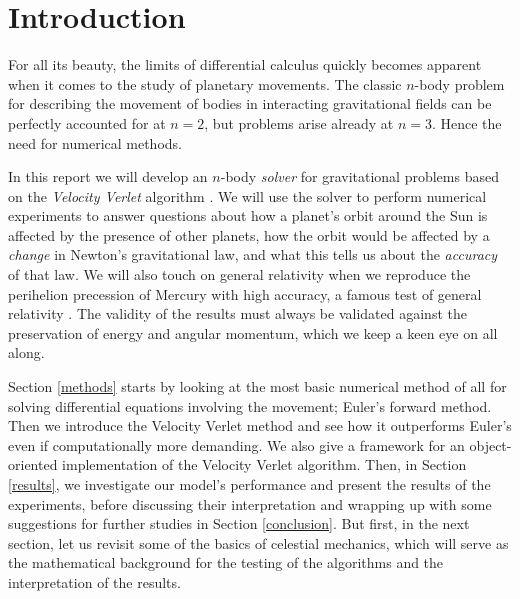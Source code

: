\documentclass[]{article}
\begin{document}
\section{Introduction} \label{intro}
For all its beauty, the limits of differential calculus quickly becomes apparent when it comes to the study of planetary movements. The classic $n$-body problem for describing the movement of bodies in interacting gravitational fields can be perfectly accounted for at $n=2$, but problems arise already at $n=3$. Hence the need for numerical methods.

In this report we will develop an $n$-body \textit{solver} for gravitational problems based on the \textit{Velocity Verlet} algorithm \cite{fys4150-notes}. We will use the solver to perform numerical experiments to answer questions about how a planet's orbit around the Sun is affected by the presence of other planets, how the orbit would be affected by a \textit{change} in Newton's gravitational law, and what this tells us about the \textit{accuracy} of that law. We will also touch on general relativity when we reproduce the perihelion precession of Mercury with high accuracy, a famous test of general relativity \cite{fys4150-p3}. The validity of the results must always be validated against the preservation of energy and angular momentum, which we keep a keen eye on all along.

Section \ref{methods} starts by looking at the most basic numerical method of all for solving differential equations involving the movement;  Euler's forward method. Then we introduce the Velocity Verlet method and see how it outperforms Euler's even if computationally more demanding. We also give a framework for an object-oriented implementation of the Velocity Verlet algorithm. Then, in Section \ref{results}, we investigate our model's performance and present the results of the experiments, before discussing their interpretation and wrapping up with some suggestions for further studies in Section \ref{conclusion}. But first, in the next section, let us revisit some of the basics of celestial mechanics, which will serve as the mathematical background for the testing of the algorithms and the interpretation of the results.
\end{document}

